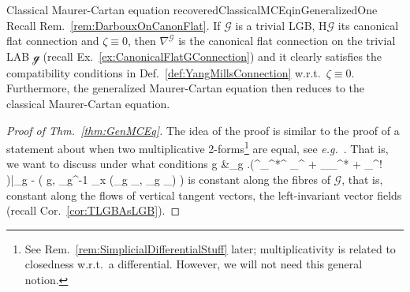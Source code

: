 \documentclass[a4paper,oneside,11pt,bibliography=totoc]{scrartcl}
\def\bas#1\eas{\begin{align*}#1\end{align*}}
\theoremstyle{plain}
\theoremstyle{remark}
\theoremstyle{definition}
\begin{document}
\begin{remarks}{Classical Maurer-Cartan equation recovered}{ClassicalMCEqinGeneralizedOne}
Recall Rem.\ \ref{rem:DarbouxOnCanonFlat}. If $\mathcal{G}$ is a trivial LGB, $\mathrm{H}\mathcal{G}$ its canonical flat connection and $\zeta \equiv 0$, then $\nabla^{\mathcal{G}}$ is the canonical flat connection on the trivial LAB $\mathcal{g}$ (recall Ex.\ \ref{ex:CanonicalFlatGConnection}) and it clearly satisfies the compatibility conditions in Def.\ \ref{def:YangMillsConnection} w.r.t.\ $\zeta \equiv 0$. Furthermore, the generalized Maurer-Cartan equation then reduces to the classical Maurer-Cartan equation.
\end{remarks}

\begin{proof}[Proof of Thm.\ \ref{thm:GenMCEq}]
\leavevmode\newline
The idea of the proof is similar to the proof of a statement about when two multiplicative 2-forms\footnote{See Rem.\ \ref{rem:SimplicialDifferentialStuff} later; multiplicativity is related to closedness w.r.t.\ a differential. However, we will not need this general notion.} are equal, see \textit{e.g.}\ \cite[\S 3, Cor.\ 3.4]{bursztyn2004integration}. That is, we want to discuss under what conditions 
\bas
\mathcal{G} \ni g &\mapsto \omega_g \coloneqq
\mleft.\mleft(^{\pi_{}^*\nabla^{}} \mu_{}^{}
	+  _{\pi_{}^*}
	+ \pi_{}^! \zeta\mright)\mright|_g
	- \mleft( g, _{g^{-1}} \circ \zeta_x \circ \mleft(_g \pi_{}, _g \pi_{}\mright) \mright)
\eas
is constant along the fibres of $\mathcal{G}$, that is, constant along the flows of vertical tangent vectors, the left-invariant vector fields (recall Cor.\ \ref{cor:TLGBAsLGB}). 


\end{proof}
\end{document}

